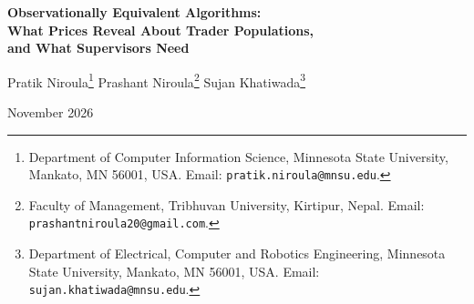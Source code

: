\documentclass[11pt,letterpaper]{article}
\theoremstyle{definition}
\begin{document}
\thispagestyle{empty}
\begin{center}
  {\LARGE\bfseries Observationally Equivalent Algorithms:\\[4pt]
  What Prices Reveal About Trader Populations,\\[4pt]
  and What Supervisors Need\par}
  \vspace{1.2em}
  {\large Pratik Niroula\footnote{Department of Computer Information Science, Minnesota State University, Mankato, MN 56001, USA. Email: \texttt{pratik.niroula@mnsu.edu}.} \qquad
  Prashant Niroula\footnote{Faculty of Management, Tribhuvan University, Kirtipur, Nepal. Email: \texttt{prashantniroula20@gmail.com}.} \qquad
  Sujan Khatiwada\footnote{Department of Electrical, Computer and Robotics Engineering, Minnesota State University, Mankato, MN 56001, USA. Email: \texttt{sujan.khatiwada@mnsu.edu}.}}
  \vspace{0.8em}

  {\normalsize November 2026}
\end{center}

\vspace{0.6em}
\begin{abstract}
\noindent
Algorithmic feedback traders read prices and, by trading, move them. We show that a heterogeneous trader population affects public prices, order flows, and dealer inventories solely through its aggregate feedback kernel, both under mechanical impact and in a stationary inventory-dealer equilibrium. Separating $K$ trader groups whose memory rates lie within $\Delta$ requires of order $\Delta^{-(4K-2)}$ price observations—a barrier that persists arbitrarily close to instability. Consequently, a uniform cut in feedback can be calibrated directly from prices and, without class tags, is the unique minimax supervisory policy for any convex loss and strictly convex, label-symmetric cost (weakly dominating every price-based policy under weak convexity). Targeted restrictions require class-tagged flow reports, which eliminate the spacing penalty for weight recovery. However, when restricted traders can route orders through alternative labels, class tags lose all value as relabeling becomes cheap, while untagged surveillance induces strategic crowding that drives equilibrium supervisory information to zero at rate $N^{-2/(p-2)}$ as the record $N$ grows. Only owner-linked audit trails escape both incentive failures. A calibration to Taiwan Stock Exchange tagged institutional flows confirms that prices pin down a uniform cut tightly while leaving targeted halts unidentified.
\end{abstract}
\end{document}
